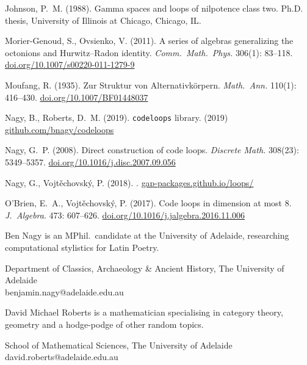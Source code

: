 \documentclass{article}
\theoremstyle{plain}
\theoremstyle{definition}
\begin{document}
\begin{thebibliography}{10}
Johnson, P.~M. (1988).
\newblock Gamma spaces and loops of nilpotence class two.
\newblock Ph.D. thesis, University of Illinois at Chicago, Chicago, IL.


Morier-Genoud, S., Ovsienko, V. (2011).
\newblock A series of algebras generalizing the octonions and Hurwitz--Radon
  identity.
\newblock \emph{Comm.\ Math.\ Phys.} 306(1): 83--118.
\newblock \url{doi.org/10.1007/s00220-011-1279-9}

Moufang, R. (1935).
\newblock Zur {S}truktur von {A}lternativk\"{o}rpern.
\newblock \emph{Math.\ Ann.} 110(1): 416--430.
\newblock \url{doi.org/10.1007/BF01448037}

 Nagy, B., Roberts, D.~M. (2019).
\newblock \texttt{codeloops} library.
\newblock %
(2019) \url{github.com/bnagy/codeloops} %

Nagy, G.~P. (2008).
\newblock Direct construction of code loops.
\newblock \emph{Discrete Math.} 308(23): 5349--5357.
\newblock \url{doi.org/10.1016/j.disc.2007.09.056}

Nagy, G., Vojt\v{e}chovsk\'{y}, P. (2018).
.
\newblock \url{gap-packages.github.io/loops/}

O'Brien, E.~A., Vojt\v{e}chovsk\'{y}, P. (2017).
\newblock Code loops in dimension at most 8.
\newblock \emph{J.\ Algebra}. 473: 607--626.
\newblock \url{doi.org/10.1016/j.jalgebra.2016.11.006}



\end{thebibliography}


\begin{biog}
\item[Ben Nagy] is an MPhil.\ candidate at the University of Adelaide, researching computational stylistics for Latin Poetry.
\begin{affil}
Department of Classics, Archaeology \& Ancient History, The University of Adelaide\\
benjamin.nagy@adelaide.edu.au
\end{affil}

\item[David Michael Roberts] is a mathematician specialising in category theory, geometry and a hodge-podge of other random topics.
\begin{affil}
School of Mathematical Sciences, The University of Adelaide\\
david.roberts@adelaide.edu.au
\end{affil}
\end{biog}
\vfill\eject
\end{document}
